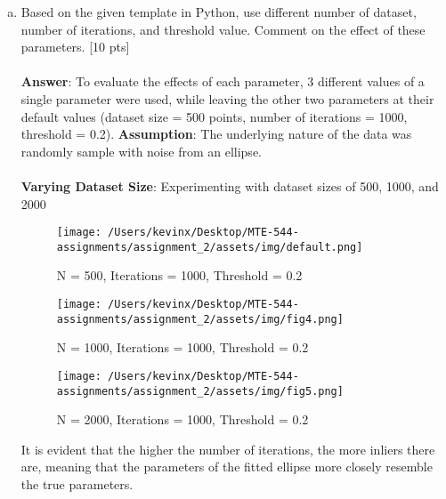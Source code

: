 \begin{enumerate}[a.)]
\item Based on the given template in Python, use different number of dataset, number of iterations, and threshold value. Comment on the effect of these parameters. [10 pts] \\
\\
\textbf{Answer}:
To evaluate the effects of each parameter, 3 different values of a single parameter were used, while leaving the other two parameters at their default values (dataset size = 500 points, number of iterations = 1000, threshold = 0.2). \textbf{Assumption}: The underlying nature of the data was randomly sample with noise from an ellipse. \\
\\
\textbf{Varying Dataset Size}: Experimenting with dataset sizes of 500, 1000, and 2000 \\
\begin{figure}[H] %
    \centering
    \texttt{[image: /Users/kevinx/Desktop/MTE-544-assignments/assignment\_2/assets/img/default.png]} %
    \caption{N = 500, Iterations = 1000, Threshold = 0.2}
    \label{fig:your_label}
\end{figure}
\begin{figure}[H] %
    \centering
    \texttt{[image: /Users/kevinx/Desktop/MTE-544-assignments/assignment\_2/assets/img/fig4.png]} %
    \caption{N = 1000, Iterations = 1000, Threshold = 0.2}
    \label{fig:your_label}
\end{figure}
\begin{figure}[H] %
    \centering
    \texttt{[image: /Users/kevinx/Desktop/MTE-544-assignments/assignment\_2/assets/img/fig5.png]} %
    \caption{N = 2000, Iterations = 1000, Threshold = 0.2}
    \label{fig:your_label}
\end{figure}
It is evident that the higher the number of iterations, the more inliers there are, meaning that the parameters of the fitted ellipse more closely resemble the true parameters. \\


\end{enumerate}
